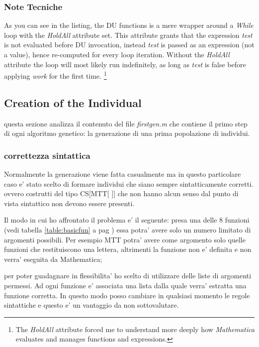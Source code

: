 \documentclass[12pt, a4paper]{article}
\begin{document}
\subsubsection{Note Tecniche}
As you can see in the listing, the DU functions is a mere wrapper around a \textit{While} loop with the \textit{HoldAll} attribute set.
This attribute grants that the expression \textit{test} is not evaluated before DU invocation, instead \textit{test} is passed as an expression (not a value), hence re-computed for every loop iteration.
Without the \textit{HoldAll} attribute the loop will most likely run indefinitely, as long as \textit{test} is false before applying \textit{work} for the first time.
\footnote{The \textit{HoldAll} attribute forced me to understand more deeply how \textit{Mathematica} evaluates and manages functions and expressions.}


\subsection{Creation of the Individual}
questa sezione analizza il contenuto del file {\itshape firstgen.m} che contiene
il primo step di ogni algoritmo genetico: la generazione di una prima popolazione di individui.

\subsubsection{correttezza sintattica}
\label{sec:sintax}
Normalmente la generazione viene fatta casualmente ma in questo particolare caso e' stato scelto di formare individui che siano sempre sintatticamente corretti. ovvero costrutti del tipo  CS[MTT[ ]] che non hanno alcun senso dal punto di vista sintattico non devono essere presenti.

Il modo in cui ho affrontato il problema e' il seguente: presa una delle 8 funzioni (vedi tabella \ref{table:basicfun} a pag \pageref{table:basicfun}) essa potra' avere solo un numero limitato di argomenti possibili. Per esempio MTT potra' avere come argomento solo quelle funzioni che restituiscono una lettera, altrimenti la funzione non e' definita e non verra' eseguita da Mathematica;

per poter guadagnare in flessibilita' ho scelto di utilizzare delle liste di argomenti permessi. Ad ogni funzione e' associata una lista dalla quale verra' estratta una funzione corretta. In questo modo posso cambiare in qualsiasi momento le regole sintattiche e questo e' un vantaggio da non sottovalutare.
\end{document}
